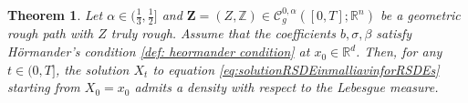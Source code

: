 \documentclass[11pt,a4paper]{article}
\newcommand{\R}{\mathbb{R}}
\theoremstyle{plain}
\newtheorem{thm}[defn]{Theorem}
\newtheorem{assumptions}[defn]{Assumptions}
\begin{document}

\begin{thm}
\label{thm: existence under hoermander}
Let $\alpha \in (\frac{1}{3},\frac{1}{2}]$ and $\mathbf{Z}=(Z,\mathbb{Z}) \in \mathscr{C}^{0,\alpha}_g([0,T];\R^n)$ be a geometric rough path with $Z$ truly rough.
    Assume that the coefficients $b,\sigma,\beta$ satisfy H\"ormander's condition \ref{def: heormander condition} { at $x_0 \in \R^d$}. Then, {for any $t \in (0,T]$}, the solution $X_t$ to equation \eqref{eq:solutionRSDEinmalliavinforRSDEs} starting from $X_0 = x_0$ admits a density with respect to the Lebesgue measure.
\end{thm}
\end{document}
